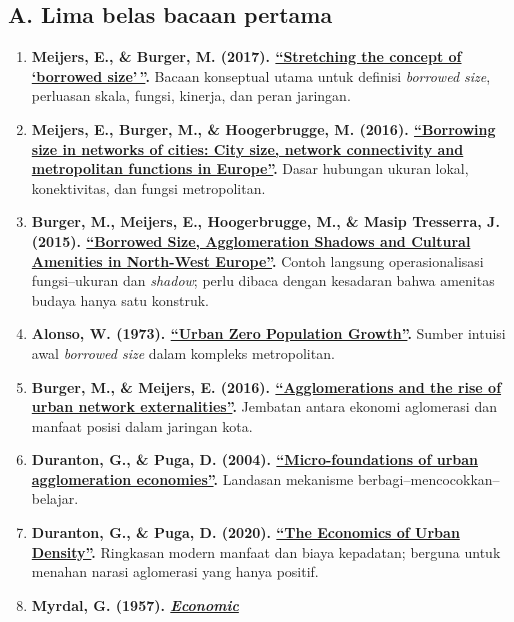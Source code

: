 \documentclass[
  indonesian,
  11pt,
  a4paper,
  oneside,
  openany]{report}
\providecommand{\tightlist}{%
  \setlength{\itemsep}{0pt}\setlength{\parskip}{0pt}}
\begin{document}
\subsection{A. Lima belas bacaan
pertama}\label{a.-lima-belas-bacaan-pertama}

\begin{enumerate}
\def\labelenumi{\arabic{enumi}.}
\tightlist
\item
  \textbf{Meijers, E., \& Burger, M. (2017).
  \href{https://doi.org/10.1177/0042098015597642}{``Stretching the
  concept of `borrowed size'\,''}.} Bacaan konseptual utama untuk
  definisi \emph{borrowed size}, perluasan skala, fungsi, kinerja, dan
  peran jaringan.
\item
  \textbf{Meijers, E., Burger, M., \& Hoogerbrugge, M. (2016).
  \href{https://doi.org/10.1111/pirs.12181}{``Borrowing size in networks
  of cities: City size, network connectivity and metropolitan functions
  in Europe''}.} Dasar hubungan ukuran lokal, konektivitas, dan fungsi
  metropolitan.
\item
  \textbf{Burger, M., Meijers, E., Hoogerbrugge, M., \& Masip Tresserra,
  J. (2015).
  \href{https://doi.org/10.1080/09654313.2014.905002}{``Borrowed Size,
  Agglomeration Shadows and Cultural Amenities in North-West Europe''}.}
  Contoh langsung operasionalisasi fungsi--ukuran dan \emph{shadow};
  perlu dibaca dengan kesadaran bahwa amenitas budaya hanya satu
  konstruk.
\item
  \textbf{Alonso, W. (1973).
  \href{https://www.jstor.org/stable/20024174}{``Urban Zero Population
  Growth''}.} Sumber intuisi awal \emph{borrowed size} dalam kompleks
  metropolitan.
\item
  \textbf{Burger, M., \& Meijers, E. (2016).
  \href{https://doi.org/10.1111/pirs.12223}{``Agglomerations and the
  rise of urban network externalities''}.} Jembatan antara ekonomi
  aglomerasi dan manfaat posisi dalam jaringan kota.
\item
  \textbf{Duranton, G., \& Puga, D. (2004).
  \href{https://doi.org/10.1016/S1574-0080(04)80005-1}{``Micro-foundations
  of urban agglomeration economies''}.} Landasan mekanisme
  berbagi--mencocokkan--belajar.
\item
  \textbf{Duranton, G., \& Puga, D. (2020).
  \href{https://doi.org/10.1257/jep.34.3.3}{``The Economics of Urban
  Density''}.} Ringkasan modern manfaat dan biaya kepadatan; berguna
  untuk menahan narasi aglomerasi yang hanya positif.
\item
  \textbf{Myrdal, G. (1957).
  \href{https://books.google.com/books?id=aujSAAAAMAAJ}{\emph{Economic
}}}
\end{enumerate}
\end{document}
